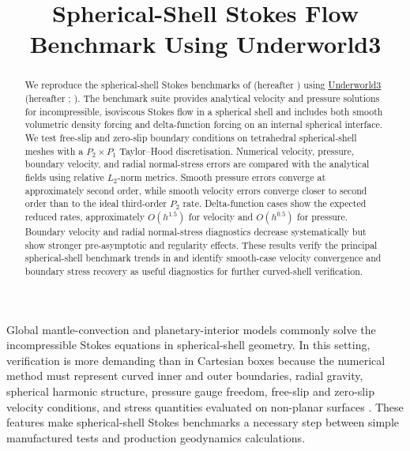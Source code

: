 \documentclass[gmd, manuscript]{copernicus}
\begin{document}
\title{Spherical-Shell Stokes Flow Benchmark Using Underworld3}




\received{}
\pubdiscuss{}
\revised{}
\accepted{}
\published{}


\maketitle

\begin{abstract}
We reproduce the spherical-shell Stokes benchmarks of \citet{kramer2021}
(hereafter ) using
\href{https://github.com/underworldcode/underworld3}{Underworld3}
(hereafter ; \citealp{Moresi2025}). The benchmark
suite provides analytical velocity and pressure solutions for incompressible,
isoviscous Stokes flow in a spherical shell and includes both smooth
volumetric density forcing and delta-function forcing on an internal spherical
interface. We test free-slip and zero-slip boundary conditions on tetrahedral
spherical-shell meshes with a \(P_2\times P_1\) Taylor--Hood discretisation.
Numerical velocity, pressure, boundary velocity, and radial normal-stress
errors are compared with the analytical fields using relative \(L_2\)-norm
metrics. Smooth pressure errors converge at approximately second order, while
smooth velocity errors converge closer to second order than to the ideal
third-order \(P_2\) rate. Delta-function cases show the expected reduced
rates, approximately \(O(h^{1.5})\) for velocity and \(O(h^{0.5})\) for
pressure. Boundary velocity and radial normal-stress diagnostics decrease
systematically but show stronger pre-asymptotic and regularity effects. These
results verify the principal  spherical-shell benchmark
trends in  and identify smooth-case velocity
convergence and boundary stress recovery as useful diagnostics for further
curved-shell verification.
\end{abstract}

\introduction

Global mantle-convection and planetary-interior models commonly solve the
incompressible Stokes equations in spherical-shell geometry. In this setting,
verification is more demanding than in Cartesian boxes because the numerical
method must represent curved inner and outer boundaries, radial gravity,
spherical harmonic structure, pressure gauge freedom, free-slip and zero-slip
velocity conditions, and stress quantities evaluated on non-planar surfaces
\citep[e.g.][]{baumgardner1985,zhong2000,tackley2008,zhong2008}. These
features make spherical-shell Stokes benchmarks a necessary step between
simple manufactured tests and production geodynamics calculations.
\end{document}
